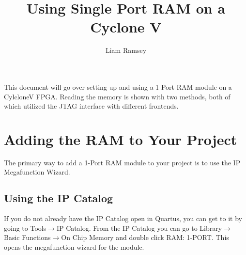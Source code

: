 \documentclass[letter,12pt]{article}
\title{Using Single Port RAM on a Cyclone V}
\author{Liam Ramsey}
\begin{document}
\maketitle

This document will go over setting up and using a 1-Port RAM module on a CylcloneV FPGA. Reading the memory is shown with two methods, both of which utilized the JTAG interface with different frontends.

\section{Adding the RAM to Your Project}
The primary way to add a 1-Port RAM module to your project is to use the IP Megafunction Wizard.

\subsection{Using the IP Catalog}

If you do not already have the IP Catalog open in Quartus, you can get to it by going to Tools$\rightarrow$IP Catalog. From the IP Catalog you can go to Library$\rightarrow$Basic Functions$\rightarrow$On Chip Memory and double click RAM: 1-PORT. This opens the megafunction wizard for the module.
\end{document}
